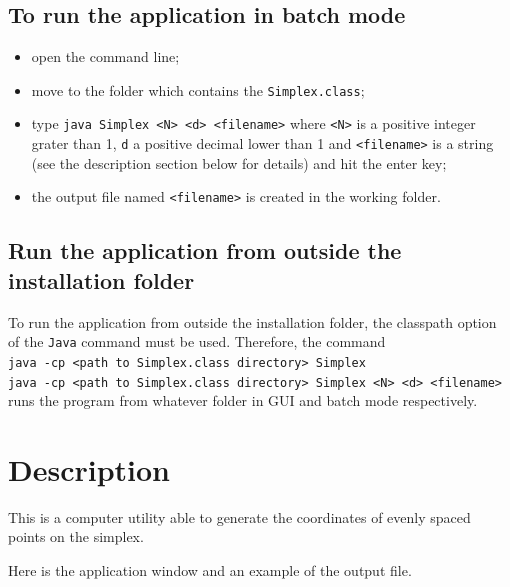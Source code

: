\documentclass[12pt,a4paper]{article}
\begin{document}
\subsection*{To run the application in batch mode}
 \begin{itemize}
\item open the command line;
\item move to the folder which contains the \verb+Simplex.class+; 
\item type \verb+java Simplex <N> <d> <filename>+ where \verb+<N>+ is a positive integer grater than 1, \verb+d+ a positive decimal lower than 1 and \verb+<filename>+ is a string  (see the description section below for details) and hit the enter key;
\item the output file named \verb+<filename>+ is created in the working folder.
\end{itemize}

\subsection*{Run the application from outside the installation folder}
To run the application from outside the installation folder, the classpath option of the \verb+Java+ command must be used.
Therefore, the command\\
\verb+java -cp <path to Simplex.class directory> Simplex+\\
\verb+java -cp <path to Simplex.class directory> Simplex <N> <d> <filename>+\\
runs the program from whatever folder in GUI and batch mode respectively.

 

\section*{Description}
This is a computer utility able to generate the coordinates of evenly spaced points on the simplex.


Here is the application window and an example of the output file.

\vspace{1cm}
\end{document}
